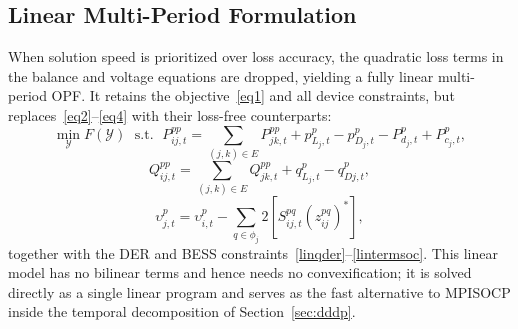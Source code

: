 \subsection{Linear Multi-Period Formulation}
\label{ssec:linear}

When solution speed is prioritized over loss accuracy, the quadratic
loss terms in the balance and voltage equations are dropped, yielding a
fully linear multi-period OPF. It retains the objective~\eqref{eq1} and
all device constraints, but replaces~\eqref{eq2}--\eqref{eq4} with their
loss-free counterparts:
\begin{equation}\label{linPij}
\min_{\mathcal{Y}} F(\mathcal{Y}) \;\text{ s.t. }\; P_{ij,t}^{pp} = \sum_{(j,k)\in E} {P_{jk,t}^{pp}} + p_{{L_j,t}}^p - p_{D_j,t}^p - P_{d_j,t}^p + P_{c_j,t}^p,
\end{equation}
\begin{equation}\label{linQij}
Q_{ij,t}^{pp} = \sum_{(j,k)\in E} {Q_{jk,t}^{pp}} + q_{{L_j,t}}^p - q_{Dj,t}^p,
\end{equation}
\begin{equation}\label{linkvl}
{\upsilon }_{j,t}^p = {\upsilon}_{i,t}^p - \sum\limits_{q \in {\phi _j}} {2\left[ {S_{ij,t}^{pq}\left( {z_{ij}^{pq}} \right)^*} \right]},
\end{equation}
together with the DER and BESS
constraints~\eqref{linqder}--\eqref{lintermsoc}. This linear model has
no bilinear terms and hence needs no convexification; it is solved
directly as a single linear program and serves as the fast alternative
to MPISOCP inside the temporal decomposition of Section~\ref{sec:dddp}.

